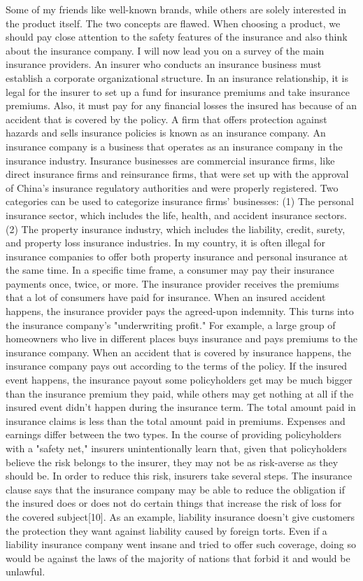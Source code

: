 \documentclass[journal]{IEEEtran}
\begin{document}
Some of my friends like well-known brands, while others are solely interested in the product itself. The two concepts are flawed. When choosing a product, we should pay close attention to the safety features of the insurance and also think about the insurance company. I will now lead you on a survey of the main insurance providers. An insurer who conducts an insurance business must establish a corporate organizational structure. In an insurance relationship, it is legal for the insurer to set up a fund for insurance premiums and take insurance premiums. Also, it must pay for any financial losses the insured has because of an accident that is covered by the policy.
A firm that offers protection against hazards and sells insurance policies is known as an insurance company. An insurance company is a business that operates as an insurance company in the insurance industry. Insurance businesses are commercial insurance firms, like direct insurance firms and reinsurance firms, that were set up with the approval of China's insurance regulatory authorities and were properly registered. Two categories can be used to categorize insurance firms' businesses: (1) The personal insurance sector, which includes the life, health, and accident insurance sectors. (2) The property insurance industry, which includes the liability, credit, surety, and property loss insurance industries. In my country, it is often illegal for insurance companies to offer both property insurance and personal insurance at the same time. In a specific time frame, a consumer may pay their insurance payments once, twice, or more. The insurance provider receives the premiums that a lot of consumers have paid for insurance. When an insured accident happens, the insurance provider pays the agreed-upon indemnity. This turns into the insurance company's "underwriting profit." For example, a large group of homeowners who live in different places buys insurance and pays premiums to the insurance company. When an accident that is covered by insurance happens, the insurance company pays out according to the terms of the policy. If the insured event happens, the insurance payout some policyholders get may be much bigger than the insurance premium they paid, while others may get nothing at all if the insured event didn't happen during the insurance term. The total amount paid in insurance claims is less than the total amount paid in premiums. Expenses and earnings differ between the two types. In the course of providing policyholders with a "safety net," insurers unintentionally learn that, given that policyholders believe the risk belongs to the insurer, they may not be as risk-averse as they should be. In order to reduce this risk, insurers take several steps. The insurance clause says that the insurance company may be able to reduce the obligation if the insured does or does not do certain things that increase the risk of loss for the covered subject[10].
As an example, liability insurance doesn't give customers the protection they want against liability caused by foreign torts. Even if a liability insurance company went insane and tried to offer such coverage, doing so would be against the laws of the majority of nations that forbid it and would be unlawful.
\end{document}
